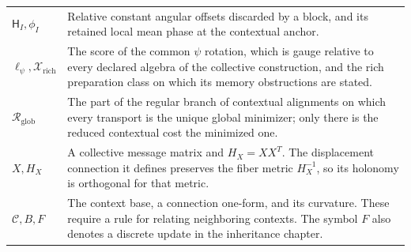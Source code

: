 \begin{longtable}{@{}>{\raggedright\arraybackslash}p{}>{\raggedright\arraybackslash}p{}@{}}
$\mathsf H_I,\phi_I$ & Relative constant angular offsets discarded by a block, and its retained local mean phase at the contextual anchor.\\
$\ell_\psi,\mathcal X_{\mathrm{rich}}$ & The score of the common $\psi$ rotation, which is gauge relative to every declared algebra of the collective construction, and the rich preparation class on which its memory obstructions are stated.\\
$\mathcal R_{\mathrm{glob}}$ & The part of the regular branch of contextual alignments on which every transport is the unique global minimizer; only there is the reduced contextual cost the minimized one.\\
$X,H_X$ & A collective message matrix and $H_X=XX^T$. The displacement connection it defines preserves the fiber metric $H_X^{-1}$, so its holonomy is orthogonal for that metric.\\
$\mathcal C,B,F$ & The context base, a connection one-form, and its curvature. These require a rule for relating neighboring contexts. The symbol $F$ also denotes a discrete update in the inheritance chapter.\\
\end{longtable}
\endgroup
